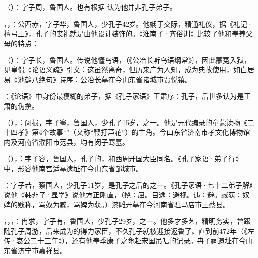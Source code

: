 （）：字子周，鲁国人。也有根据  认为他并非孔子弟子。

，，：公西赤，字子华，鲁国人，少孔子42岁。他娴于交际，精通礼仪，据《礼记·檀弓上》，孔子的丧礼就是由他设计装饰的。《淮南子·齐俗训》比较了他和奉养父母的特点：

（）：字子长，鲁国人。传说他懂鸟语，（《公冶长听鸟语纲常》），因此蒙冤入狱，见皇侃《论语义疏》引文：这虽然离奇，但历来广为人知，成为典故使用，如白居易《池鹤八绝句》诗序：公冶长墓在今山东省诸城市贾悦镇。

：《论语》中身份最模糊的弟子，据《孔子家语》王肃序：孔子，后世多认为是王肃的伪撰。

（），：闵损，字子骞，鲁国人，少孔子15岁，之一。他是元代编录的童蒙读物《二十四孝》第4个故事“”（又称“鞭打芦花”）的主角。今山东省济南市孝文化博物馆内及河南省濮阳市范县，均有闵子骞墓。

（），：字子容，鲁国人，孔子的，和西周开国大臣同名。《孔子家语·弟子行》中，形容他南宫适墓遗址在今山东省邹城市。

：字子若，蔡国人，少孔子11岁，是孔子之后的之一。《孔子家语·七十二弟子解》说他《韩非子·显学》说他方正刚直，（挠：屈。目逃：避视。违：避。臧获：奴婢的贱称，骂奴为臧，骂婢为获。）漆雕开墓在今河南省驻马店市上蔡县。

，，，：冉求，字子有，鲁国人，少孔子29岁，之一。他多才多艺，精明务实，曾跟随孔子周游，后来成为的得力家臣，不久孔子就被迎接返鲁了。直到前472年（《左传·哀公二十三年》），还有他奉季康子之命赴宋国吊唁的记录。冉子祠遗址在今山东省济宁市嘉祥县。


